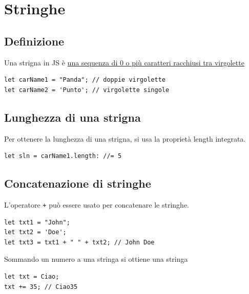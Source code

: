 \section{Stringhe}
\subsection{Definizione}
Una strigna in JS è \uline{una sequenza di 0 o più caratteri racchiusi tra virgolette}
\begin{lstlisting}
let carName1 = "Panda"; // doppie virgolette
let carName2 = 'Punto'; // virgolette singole
\end{lstlisting}

\subsection{Lunghezza di una strigna}
Per ottenere la lunghezza di una strigna, si usa la proprietà length integrata.
\begin{lstlisting}
let sln = carName1.length: //= 5
\end{lstlisting}

\subsection{Concatenazione di stringhe}
L'operatore \texttt{+} può essere usato per concatenare le stringhe.

\begin{lstlisting}
let txt1 = "John";
let txt2 = 'Doe';
let txt3 = txt1 + " " + txt2; // John Doe
\end{lstlisting}

Sommando un numero a una stringa si ottiene una stringa
\begin{lstlisting}
let txt = Ciao;
txt += 35; // Ciao35
\end{lstlisting}

